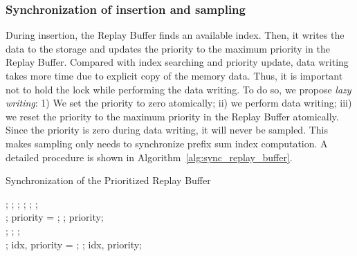 \subsubsection{Synchronization of insertion and sampling}
During insertion, the Replay Buffer finds an available index. Then, it writes the data to the storage and updates the priority to the maximum priority in the Replay Buffer. Compared with index searching and priority update, data writing takes more time due to explicit copy of the memory data. Thus, it is important not to hold the lock while performing the data writing. To do so, we propose \textit{lazy writing}: 1) We set the priority to zero atomically; ii) we perform data writing; iii) we reset the priority to the maximum priority in the Replay Buffer atomically. Since the priority is zero during data writing, it will never be sampled. This makes sampling only needs to synchronize prefix sum index computation. A detailed procedure is shown in Algorithm~\ref{alg:sync_replay_buffer}.


\begin{algorithm}[!t]
    \caption{Synchronization of the Prioritized Replay Buffer}
    \label{alg:sync_replay_buffer}
    \begin{algorithmic}[1]
            \State {};
            \State {};
            \State {};
            \State {};
            \State {};
            \State {};
        \EndFunction
        \\
            \State {};
            \State priority = ;
            \State {};
            \State \Return priority;
        \EndFunction
        \\
            \State {};
            \State {};
            \State {};
        \EndFunction
        \\
            \State {};
            \State idx, priority = ;
            \State {};
            \State \Return idx, priority;
        \EndFunction
    \end{algorithmic}
\end{algorithm}


